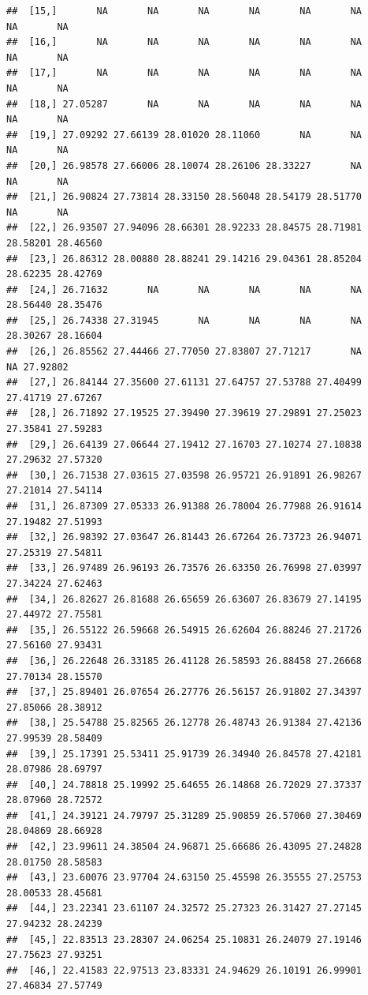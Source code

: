 \documentclass{article}\usepackage[]{graphicx}\usepackage[]{color}
\makeatletter
\newenvironment{kframe}{%
 \def\at@end@of@kframe{}%
 \ifinner\ifhmode%
  \def\at@end@of@kframe{\end{minipage}}%
  \begin{minipage}{\columnwidth}%
 \fi\fi%
 \def\FrameCommand##1{\hskip\@totalleftmargin \hskip-\fboxsep
 \colorbox{shadecolor}{##1}\hskip-\fboxsep
     \hskip-\linewidth \hskip-\@totalleftmargin \hskip\columnwidth}%
 \MakeFramed {\advance\hsize-\width
   \@totalleftmargin\z@ \linewidth\hsize
   \@setminipage}}%
 {\par\unskip\endMakeFramed%
 \at@end@of@kframe}
\newenvironment{knitrout}{}{} %
\makeatother
\begin{document}
\begin{knitrout}
\begin{kframe}
\begin{verbatim}
##  [15,]       NA       NA       NA       NA       NA       NA       NA       NA
##  [16,]       NA       NA       NA       NA       NA       NA       NA       NA
##  [17,]       NA       NA       NA       NA       NA       NA       NA       NA
##  [18,] 27.05287       NA       NA       NA       NA       NA       NA       NA
##  [19,] 27.09292 27.66139 28.01020 28.11060       NA       NA       NA       NA
##  [20,] 26.98578 27.66006 28.10074 28.26106 28.33227       NA       NA       NA
##  [21,] 26.90824 27.73814 28.33150 28.56048 28.54179 28.51770       NA       NA
##  [22,] 26.93507 27.94096 28.66301 28.92233 28.84575 28.71981 28.58201 28.46560
##  [23,] 26.86312 28.00880 28.88241 29.14216 29.04361 28.85204 28.62235 28.42769
##  [24,] 26.71632       NA       NA       NA       NA       NA 28.56440 28.35476
##  [25,] 26.74338 27.31945       NA       NA       NA       NA 28.30267 28.16604
##  [26,] 26.85562 27.44466 27.77050 27.83807 27.71217       NA       NA 27.92802
##  [27,] 26.84144 27.35600 27.61131 27.64757 27.53788 27.40499 27.41719 27.67267
##  [28,] 26.71892 27.19525 27.39490 27.39619 27.29891 27.25023 27.35841 27.59283
##  [29,] 26.64139 27.06644 27.19412 27.16703 27.10274 27.10838 27.29632 27.57320
##  [30,] 26.71538 27.03615 27.03598 26.95721 26.91891 26.98267 27.21014 27.54114
##  [31,] 26.87309 27.05333 26.91388 26.78004 26.77988 26.91614 27.19482 27.51993
##  [32,] 26.98392 27.03647 26.81443 26.67264 26.73723 26.94071 27.25319 27.54811
##  [33,] 26.97489 26.96193 26.73576 26.63350 26.76998 27.03997 27.34224 27.62463
##  [34,] 26.82627 26.81688 26.65659 26.63607 26.83679 27.14195 27.44972 27.75581
##  [35,] 26.55122 26.59668 26.54915 26.62604 26.88246 27.21726 27.56160 27.93431
##  [36,] 26.22648 26.33185 26.41128 26.58593 26.88458 27.26668 27.70134 28.15570
##  [37,] 25.89401 26.07654 26.27776 26.56157 26.91802 27.34397 27.85066 28.38912
##  [38,] 25.54788 25.82565 26.12778 26.48743 26.91384 27.42136 27.99539 28.58409
##  [39,] 25.17391 25.53411 25.91739 26.34940 26.84578 27.42181 28.07986 28.69797
##  [40,] 24.78818 25.19992 25.64655 26.14868 26.72029 27.37337 28.07960 28.72572
##  [41,] 24.39121 24.79797 25.31289 25.90859 26.57060 27.30469 28.04869 28.66928
##  [42,] 23.99611 24.38504 24.96871 25.66686 26.43095 27.24828 28.01750 28.58583
##  [43,] 23.60076 23.97704 24.63150 25.45598 26.35555 27.25753 28.00533 28.45681
##  [44,] 23.22341 23.61107 24.32572 25.27323 26.31427 27.27145 27.94232 28.24239
##  [45,] 22.83513 23.28307 24.06254 25.10831 26.24079 27.19146 27.75623 27.93251
##  [46,] 22.41583 22.97513 23.83331 24.94629 26.10191 26.99901 27.46834 27.57749

\end{verbatim}
\end{kframe}
\end{knitrout}
\end{document}
